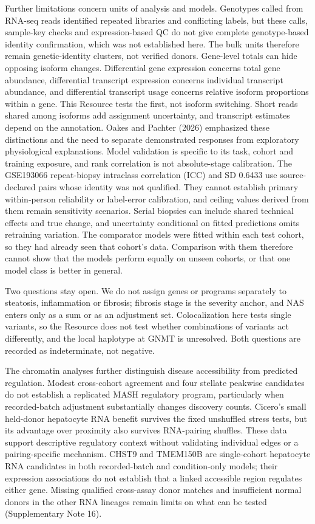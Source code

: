 Further limitations concern units of analysis and models. Genotypes called from RNA-seq
reads identified repeated libraries and conflicting labels, but these calls,
sample-key checks and expression-based QC do not give complete genotype-based
identity confirmation, which was not established here. The bulk units therefore remain genetic-identity
clusters, not verified donors. Gene-level totals can hide opposing isoform
changes. Differential gene expression concerns total gene abundance,
differential transcript expression concerns individual transcript abundance, and
differential transcript usage concerns relative isoform proportions within a
gene. This Resource tests the first, not isoform switching. Short reads shared
among isoforms add assignment uncertainty, and transcript estimates depend on
the annotation. Oakes and Pachter (2026) emphasized these distinctions and the need to
separate demonstrated responses from exploratory physiological explanations. Model validation is specific to its task, cohort and
training exposure, and rank correlation is not absolute-stage calibration. The
GSE193066 repeat-biopsy intraclass correlation (ICC) and SD 0.6433 use
source-declared pairs whose identity was not qualified. They cannot establish
primary within-person reliability or label-error calibration, and ceiling values
derived from them remain sensitivity scenarios. Serial biopsies can include
shared technical effects and true change, and uncertainty conditional on fitted
predictions omits retraining variation. The comparator models were fitted
within each test cohort, so they had already seen that cohort's data.
Comparison with them therefore cannot show that the models perform equally on
unseen cohorts, or that one model class is better in general.

Two questions stay open. We do not assign genes or programs separately to steatosis, inflammation or fibrosis; fibrosis stage is the severity anchor, and NAS enters only as a sum or as an adjustment set. Colocalization here tests single variants, so the Resource does not test whether combinations of variants act differently, and the local haplotype at GNMT is unresolved. Both questions are recorded as indeterminate, not negative.

The chromatin analyses further distinguish disease accessibility from predicted
regulation. Modest cross-cohort agreement and four stellate peakwise candidates
do not establish a replicated MASH regulatory program, particularly when
recorded-batch adjustment substantially changes discovery counts. Cicero's
small held-donor hepatocyte RNA benefit survives the fixed unshuffled stress
tests, but its advantage over proximity also survives RNA-pairing shuffles.
These data support descriptive regulatory context without validating individual
edges or a pairing-specific mechanism. CHST9 and TMEM150B are single-cohort
hepatocyte RNA candidates in both recorded-batch and condition-only models;
their expression associations do not establish that a linked accessible region
regulates either gene. Missing qualified cross-assay donor matches and
insufficient normal donors in the other RNA lineages remain limits on what can
be tested (Supplementary Note 16).

